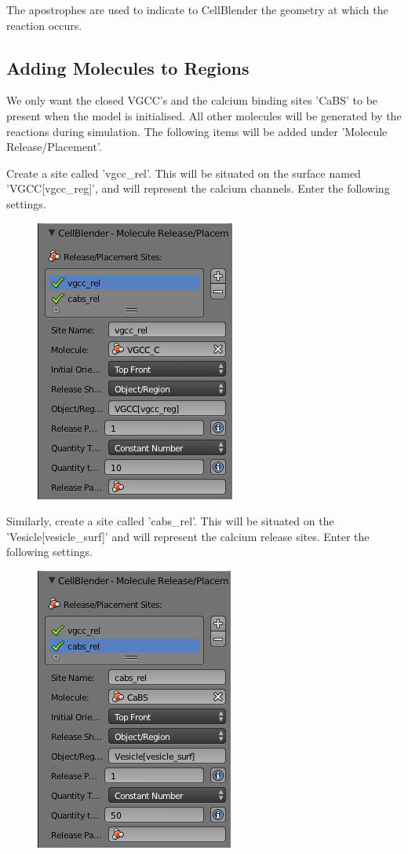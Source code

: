 \documentclass[twoside,a4paper]{refart}
\begin{document}
The apostrophes are used to indicate to CellBlender the geometry at which the reaction occurs.


\subsection{Adding Molecules to Regions}
We only want the closed VGCC's and the calcium binding sites 'CaBS' to be present when the model is initialised. All other molecules will be generated by the reactions during simulation. The following items will be added under 'Molecule Release/Placement'. 

Create a site called 'vgcc\_rel'. This will be situated on the surface named 'VGCC[vgcc\_reg]', and will represent the calcium channels. Enter the following settings.
    \begin{figure}[H]
        \includegraphics[scale=0.5]{settings1.png}
    \end{figure}


Similarly, create a site called 'cabs\_rel'. This will be situated on the 'Vesicle[vesicle\_surf]' and will represent the calcium release sites. Enter the following settings.
    \begin{figure}[H]
        \includegraphics[scale=0.5]{settings2.png}
    \end{figure}
\end{document}
